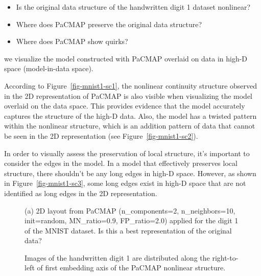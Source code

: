 \documentclass[
  12pt]{article}
\providecommand{\tightlist}{%
  \setlength{\itemsep}{0pt}\setlength{\parskip}{0pt}}\usepackage{longtable,booktabs,array}
\begin{document}
\begin{itemize}
\tightlist
\item
  Is the original data structure of the handwritten digit 1 dataset
  nonlinear?
\item
  Where does PaCMAP preserve the original data structure?
\item
  Where does PaCMAP show quirks?
\end{itemize}

we visualize the model constructed with PaCMAP overlaid on data in
high-D space (model-in-data space).

According to Figure~\ref{fig-mnist1-sc1}, the nonlinear continuity
structure observed in the 2D representation of PaCMAP is also visible
when visualizing the model overlaid on the data space. This provides
evidence that the model accurately captures the structure of the high-D
data. Also, the model has a twisted pattern within the nonlinear
structure, which is an addition pattern of data that cannot be seen in
the 2D representation (see Figure~\ref{fig-mnist1-sc2}).

In order to visually assess the preservation of local structure, it's
important to consider the edges in the model. In a model that
effectively preserves local structure, there shouldn't be any long edges
in high-D space. However, as shown in Figure~\ref{fig-mnist1-sc3}, some
long edges exist in high-D space that are not identified as long edges
in the 2D representation.

\begin{figure}[H]


\caption{\label{fig-pacmapauthor}(a) 2D layout from PaCMAP
(n\_components=2, n\_neighbors=10, init=random, MN\_ratio=0.9,
FP\_ratio=2.0) applied for the digit 1 of the MNIST dataset. Is this a
best representation of the original data?}

\end{figure}%

\begin{figure}[H]


\caption{\label{fig-sampleimg}Images of the handwritten digit 1 are
distributed along the right-to-left of first embedding axis of the
PaCMAP nonlinear structure.}

\end{figure}%
\end{document}
